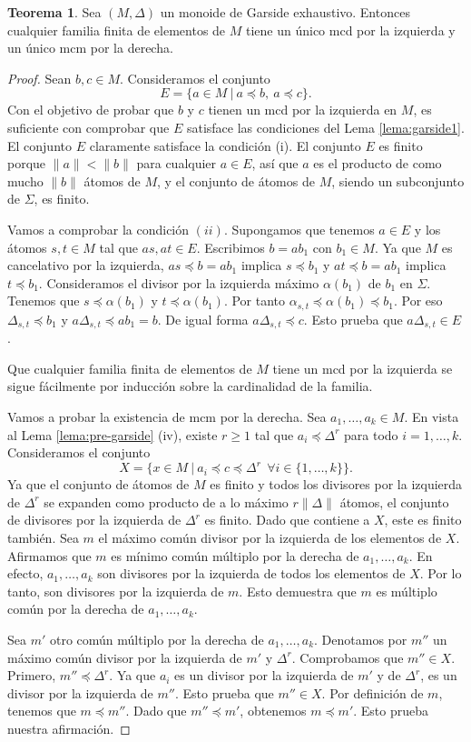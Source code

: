 \documentclass[12pt]{book}
\theoremstyle{definition}
\newtheorem{teor}{Teorema}[section]
\providecommand{\norm}[1]{\lVert#1\rVert}
\begin{document}
\begin{teor}
Sea $(M,\Delta)$ un monoide de Garside exhaustivo. Entonces cualquier familia finita de elementos de $M$ tiene un único mcd por la izquierda y un único mcm por la derecha.
\end{teor}
\begin{proof} Sean $b,c\in M$. Consideramos el conjunto
$$E=\{a\in M\ |\ a\preceq b,\ a\preceq c\}.$$
Con el objetivo de probar que $b$ y $c$ tienen un mcd por la izquierda en $M$, es suficiente con comprobar que $E$ satisface las condiciones del Lema \ref{lema:garside1}. El conjunto $E$ claramente satisface la condición (i). El conjunto $E$ es finito porque $\norm{a}<\norm{b}$ para cualquier $a\in E$, así que $a$ es el producto de como mucho $\norm{b}$ átomos de $M$, y el conjunto de átomos de $M$, siendo un subconjunto de $\Sigma$, es finito.

Vamos a comprobar la condición $(ii)$. Supongamos que tenemos $a\in E$ y los átomos $s,t\in M$ tal que $as,at\in E$. Escribimos $b=ab_1$ con $b_1\in M$. Ya que $M$ es cancelativo por la izquierda, $as\preceq b =ab_1$ implica $s\preceq b_1$ y $at\preceq b = ab_1$ implica $t\preceq b_1$. Consideramos el divisor por la izquierda máximo $\alpha(b_1)$ de $b_1$ en $\Sigma$. Tenemos que $s\preceq\alpha(b_1)$ y $t\preceq\alpha(b_1)$. Por tanto $\alpha_{s,t}\preceq \alpha(b_1)\preceq b_1$. Por eso $\Delta_{s,t}\preceq b_1$ y $a\Delta_{s,t}\preceq ab_1= b$. De igual forma $a\Delta_{s,t}\preceq c$. Esto prueba que $a\Delta_{s,t}\in E$.

Que cualquier familia finita de elementos de $M$ tiene un mcd por la izquierda se sigue fácilmente por inducción sobre la cardinalidad de la familia.

Vamos a probar la existencia de mcm por la derecha. Sea $a_1,\ldots,a_k\in M$. En vista al Lema \ref{lema:pre-garside} (iv), existe $r\geq 1$ tal que $a_i\preceq\Delta^r$ para todo $i=1,\ldots,k$. Consideramos el conjunto
$$X=\{x\in M\ |\ a_i\preceq c\preceq\Delta^r\ \ \forall i\in\{1,\ldots,k\}\}.$$
Ya que el conjunto de átomos de $M$ es finito y todos los divisores por la izquierda de $\Delta^r$ se expanden como producto de a lo máximo $r\norm{\Delta}$ átomos, el conjunto de divisores por la izquierda de $\Delta^r$ es finito. Dado que contiene a $X$, este es finito también. Sea $m$ el máximo común divisor por la izquierda de los elementos de $X$. Afirmamos que $m$ es mínimo común múltiplo por la derecha de $a_1,\ldots,a_k$. En efecto, $a_1,\ldots,a_k$ son divisores por la izquierda de todos los elementos de $X$. Por lo tanto, son divisores por la izquierda de $m$. Esto demuestra que $m$ es múltiplo común por la derecha de $a_1,\ldots,a_k$.

Sea $m'$ otro común múltiplo por la derecha de $a_1,\ldots,a_k$. Denotamos por $m''$ un máximo común divisor por la izquierda de $m'$ y $\Delta^r$. Comprobamos que $m''\in X$. Primero, $m''\preceq\Delta^r$. Ya que $a_i$ es un divisor por la izquierda de $m'$ y de $\Delta^r$, es un divisor por la izquierda de $m''$. Esto prueba que $m''\in X$. Por definición de $m$, tenemos que $m\preceq m''$. Dado que $m''\preceq m'$, obtenemos $m\preceq m'$. Esto prueba nuestra afirmación.
\end{proof}
\end{document}
